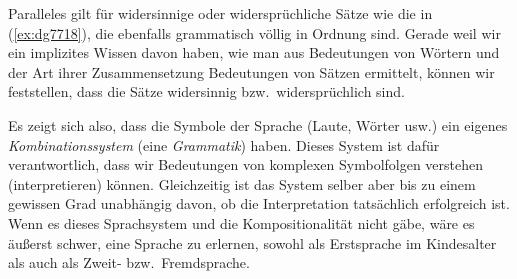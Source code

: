 Paralleles gilt für widersinnige oder widersprüchliche Sätze wie die in (\ref{ex:dg7718}), die ebenfalls grammatisch völlig in Ordnung sind.
Gerade weil wir ein implizites Wissen davon haben, wie man aus Bedeutungen von Wörtern und der Art ihrer Zusammensetzung Bedeutungen von Sätzen ermittelt, können wir feststellen, dass die Sätze widersinnig bzw.\ widersprüchlich sind.

\begin{exe}
  \ex\label{ex:dg7718}
  \begin{xlist}
  \end{xlist}
\end{exe}

Es zeigt sich also, dass die Symbole der Sprache (Laute, Wörter usw.) ein eigenes \textit{Kombinationssystem} (eine \textit{Grammatik}) haben.
Dieses System ist dafür verantwortlich, dass wir Bedeutungen von komplexen Symbolfolgen verstehen (interpretieren) können.
Gleichzeitig ist das System selber aber bis zu einem gewissen Grad unabhängig davon, ob die Interpretation tatsächlich erfolgreich ist.
Wenn es dieses Sprachsystem und die Kompositionalität nicht gäbe, wäre es äußerst schwer, eine Sprache zu erlernen, sowohl als Erstsprache im Kindesalter als auch als Zweit- bzw.\ Fremdsprache.

